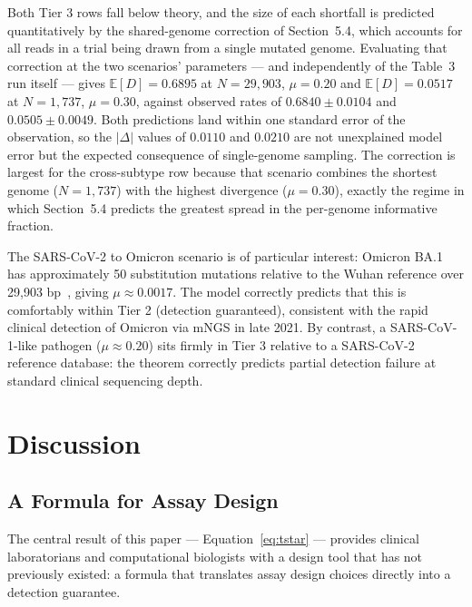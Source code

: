 \documentclass[12pt]{article}
\theoremstyle{definition}
\theoremstyle{plain}
\newcommand{\E}{\mathbb{E}}
\begin{document}
Both Tier 3 rows fall below theory, and the size of each shortfall is
predicted quantitatively by the shared-genome correction of Section~5.4,
which accounts for all reads in a trial being drawn from a single mutated
genome. Evaluating that correction at the two scenarios' parameters --- and
independently of the Table~3 run itself --- gives
$\E[D]=0.6895$ at $N=29{,}903$, $\mu=0.20$ and $\E[D]=0.0517$ at $N=1{,}737$,
$\mu=0.30$, against observed rates of $0.6840\pm0.0104$ and
$0.0505\pm0.0049$. Both predictions land within one standard error of the
observation, so the $|\Delta|$ values of $0.0110$ and $0.0210$ are not
unexplained model error but the expected consequence of single-genome
sampling. The correction is largest for the cross-subtype row because that
scenario combines the shortest genome ($N=1{,}737$) with the highest
divergence ($\mu=0.30$), exactly the regime in which Section~5.4 predicts
the greatest spread in the per-genome informative fraction.

The SARS-CoV-2 to Omicron scenario is of particular interest: Omicron BA.1
has approximately 50 substitution mutations relative to the Wuhan reference
over 29,903 bp~\cite{viana2022}, giving $\mu\approx0.0017$. The model
correctly predicts that this is comfortably within Tier 2 (detection
guaranteed), consistent with the rapid clinical detection of Omicron via
mNGS in late 2021. By contrast, a SARS-CoV-1-like pathogen
($\mu\approx0.20$) sits firmly in Tier 3 relative to a SARS-CoV-2 reference
database: the theorem correctly predicts partial detection failure at
standard clinical sequencing depth.

\section{Discussion}

\subsection{A Formula for Assay Design}

The central result of this paper --- Equation~\eqref{eq:tstar} --- provides
clinical laboratorians and computational biologists with a design tool that
has not previously existed: a formula that translates assay design choices
directly into a detection guarantee.
\end{document}
